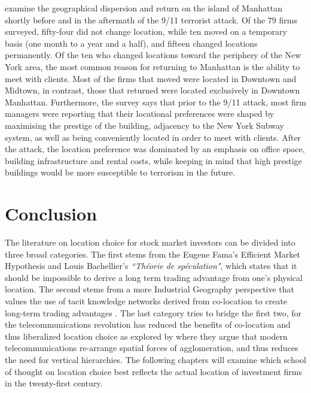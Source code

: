 \cite{gongthe2012} examine the geographical dispersion and return on the island of Manhattan shortly before and in the aftermath of the 9/11 terrorist attack. Of the 79 firms surveyed, fifty-four did not change location, while ten moved on a temporary basis (one month to a year and a half), and fifteen changed locations permanently.  Of the ten who changed locations toward the periphery of the New York area, the most common reason for returning to Manhattan is the ability to meet with clients.  Most of the firms that moved were located in Downtown and Midtown, in contrast,  those that returned were located exclusively in Downtown Manhattan. Furthermore, the survey says that prior to the 9/11 attack, most firm managers were reporting that their locational preferences were shaped by maximising the prestige of the building, adjacency to the New York Subway system, as well as being conveniently located in order to meet with clients.    After the attack, the location preference was dominated by an emphasis on office space, building infrastructure and rental costs, while keeping in mind that high prestige buildings would be more susceptible to terrorism in the future.  
	
\section{Conclusion}	

The literature on location choice for stock market investors can be divided into three broad categories.  The first stems from the Eugene Fama's Efficient Market Hypothesis  and Louis Bachellier's  \textit{``Th\'{e}orie de sp\'{e}culation"}, which states that it should be impossible to derive a long term trading advantage from one's physical location.  The second stems from a more Industrial Geography perspective that values the use of tacit knowledge networks derived from co-location to create long-term trading advantages \citep{Westaway1974,covalthe2001}.  The last category tries to bridge the first two, for the telecommunications revolution has reduced the benefits of co-location and thus liberalized location choice as explored by \cite{Moriset2009} where they argue that modern telecommunications re-arrange spatial forces of agglomeration, and thus reduces the need for vertical hierarchies.  The following chapters will examine which school of thought on location choice best reflects the actual location of investment firms in the twenty-first century.

